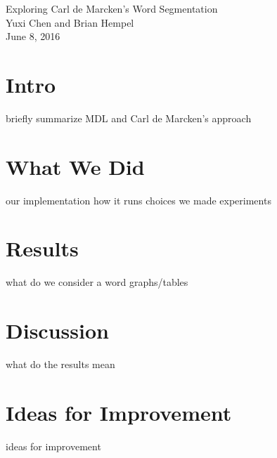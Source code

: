 \documentclass[11pt, oneside, fleqn]{article}
\begin{document}
  \begin{center}
  \LARGE{Exploring Carl de Marcken's Word Segmentation}\\[0.5em]
  \large{Yuxi Chen and Brian Hempel}\\[0.5em]
  \large{June 8, 2016}\\[0.5em]
  \end{center}

  \vspace{1em}

  \section*{Intro}

  briefly summarize MDL and Carl de Marcken's approach

  \section*{What We Did}

  our implementation
  how it runs
  choices we made
  experiments

  \section*{Results}

  what do we consider a word
  graphs/tables

  \section*{Discussion}

  what do the results mean

  \section*{Ideas for Improvement}

  ideas for improvement
\end{document}

